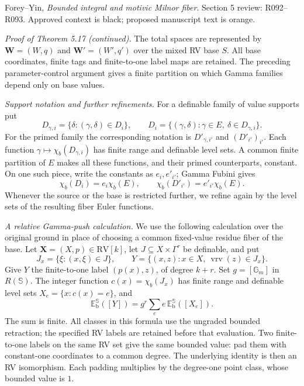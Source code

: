 \documentclass[12pt]{amsart}
\theoremstyle{remark}
\theoremstyle{definition}
\newcommand{\RV}{\mathrm{RV}}
\newcommand{\vrv}{\operatorname{vrv}}
\newcommand{\Sbase}{\mathbb S}
\numberwithin{equation}{section}
\newcommand{\Gm}{\mathbb G_m}
\theoremstyle{plain}
\begin{document}
\setcounter{section}{5}
\setcounter{subsection}{2}
{\small\noindent Forey--Yin, \emph{Bounded integral and motivic Milnor fiber}.
Section 5 review: R092--R093.
Approved context is black; proposed manuscript text is orange.}
\medskip

\noindent\emph{Proof of Theorem 5.17 (continued).}
The total spaces are represented by
$\bm W=(W,q)$ and $\bm W'=(W',q')$ over the mixed RV base
$S$. All base coordinates, finite tags and finite-to-one
label maps are retained.
The preceding parameter-control argument gives a finite
partition on which Gamma families depend only on base
values.

{\color{ProposalOrange}
\medskip
\noindent\emph{Support notation and further refinements.}
For a definable family of value supports put
\[
 D_{\gamma,i}=\{\delta:(\gamma,\delta)\in D_i\},\qquad
 D_i=\{(\gamma,\delta):\gamma\in E,\ \delta\in D_{\gamma,i}\}.
\]
For the primed family the corresponding notation is
$D'_{\gamma,i'}$ and $(D'_{i'})_{i'}$.
Each function $\gamma\mapsto\chi_b(D_{\gamma,i})$ has
finite range and definable level sets.
A common finite partition of $E$ makes all these functions,
and their primed counterparts, constant. On one such piece,
write the constants as $e_i,e'_{i'}$; Gamma Fubini gives
\[
 \chi_b(D_i)=e_i\chi_b(E),\qquad
 \chi_b(D'_{i'})=e'_{i'}\chi_b(E).
\]
Whenever the source or the base is restricted further,
we refine again by the level sets of the resulting fiber
Euler functions.

\medskip
\noindent\emph{A relative Gamma-push calculation.}
We use the following calculation over the original ground
in place of choosing a common fixed-value residue fiber
of the base.
Let $\bm X=(X,p)\in\RV[k]$, let
$J\subseteq X\times\Gamma^r$ be definable, and put
\[
 J_x=\{\xi:(x,\xi)\in J\},\qquad
 Y=\{(x,z):x\in X,\ \vrv(z)\in J_x\}.
\]
Give $Y$ the finite-to-one label $(p(x),z)$, of degree
$k+r$. Set $g=[\Gm]$ in $R(\Sbase)$.
The integer function $c(x)=\chi_b(J_x)$ has finite range
and definable level sets $X_e=\{x:c(x)=e\}$, and
\begin{equation}\label{relative:Gamma:push}
 \mathbb E_{\mathrm b}^{\Sbase}([Y])
       =g^r\sum_e e\,
               \mathbb E_{\mathrm b}^{\Sbase}([X_e]).
\end{equation}
The sum is finite. All classes in this formula use the
ungraded bounded retraction; the specified RV labels are
retained before that evaluation.
Two finite-to-one labels on the same RV set give the same
bounded value: pad them with constant-one coordinates to
a common degree. The underlying identity is then an RV
isomorphism. Each padding multiplies by the degree-one
point class, whose bounded value is $1$.

}
\end{document}
